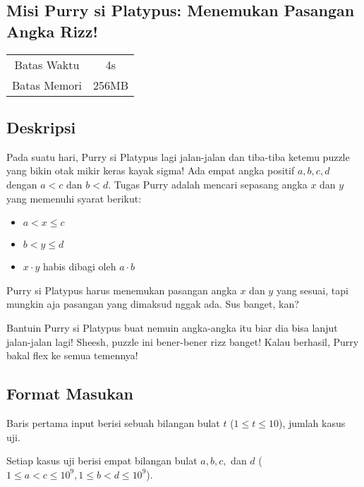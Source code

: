 \documentclass{article}
\begin{document}
\begin{center}
    \section*{Misi Purry si Platypus: Menemukan Pasangan Angka Rizz!} %

    \begin{tabular}{ | c c | }
        \hline
        Batas Waktu  & 4s \\    %
        Batas Memori & 256MB \\  %
        \hline
    \end{tabular}
\end{center}

\subsection*{Deskripsi}

Pada suatu hari, Purry si Platypus lagi jalan-jalan dan tiba-tiba ketemu puzzle yang bikin otak mikir keras kayak sigma! Ada empat angka positif $a, b, c, d$ dengan $a < c$ dan $b < d$. Tugas Purry adalah mencari sepasang angka $x$ dan $y$ yang memenuhi syarat berikut:

\begin{itemize}
    \item $a < x \leq c$
    \item $b < y \leq d$
    \item $x \cdot y$ habis dibagi oleh $a \cdot b$
\end{itemize}

Purry si Platypus harus menemukan pasangan angka $x$ dan $y$ yang sesuai, tapi mungkin aja pasangan yang dimaksud nggak ada. Sus banget, kan?

Bantuin Purry si Platypus buat nemuin angka-angka itu biar dia bisa lanjut jalan-jalan lagi! Sheesh, puzzle ini bener-bener rizz banget! Kalau berhasil, Purry bakal flex ke semua temennya!

\subsection*{Format Masukan}

Baris pertama input berisi sebuah bilangan bulat $t$ ($1 \leq t \leq 10$), jumlah kasus uji.

Setiap kasus uji berisi empat bilangan bulat $a, b, c,$ dan $d$ ($1 \leq a < c \leq 10^9, 1 \leq b < d \leq 10^9$).
\end{document}
